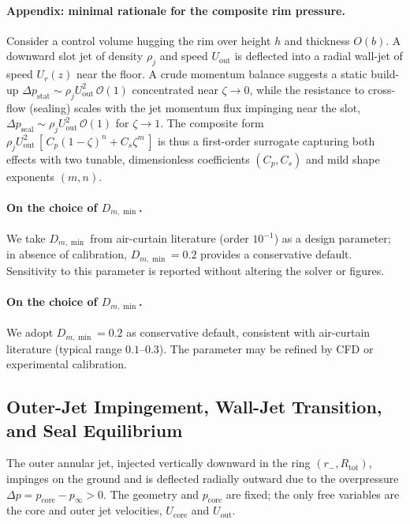 \documentclass[11pt,a4paper]{article}
\begin{document}
\paragraph{Appendix: minimal rationale for the composite rim pressure.}
Consider a control volume hugging the rim over height $h$ and thickness $O(b)$.
A downward slot jet of density $\rho_j$ and speed $U_{\mathrm{out}}$ is deflected
into a radial wall-jet of speed $U_r(z)$ near the floor. A crude momentum balance
suggests a static build-up $\Delta p_{\mathrm{stat}}\sim \rho_j U_{\mathrm{out}}^2
\,\mathcal{O}(1)$ concentrated near $\zeta\!\to\!0$, while the resistance to
cross-flow (sealing) scales with the jet momentum flux impinging near the slot,
$\Delta p_{\mathrm{seal}}\sim \rho_j U_{\mathrm{out}}^2\,\mathcal{O}(1)$ for
$\zeta\!\to\!1$. The composite form
$\rho_j U_{\mathrm{out}}^2\,[\,C_p(1-\zeta)^n + C_s \zeta^m\,]$ is thus a
first-order surrogate capturing both effects with two tunable, dimensionless
coefficients $(C_p,C_s)$ and mild shape exponents $(m,n)$.

\paragraph{On the choice of $D_{m,\min}$.}
We take $D_{m,\min}$ from air-curtain literature (order $10^{-1}$) as a design parameter; in absence of calibration, $D_{m,\min}=0.2$ provides a conservative default.
Sensitivity to this parameter is reported without altering the solver or figures.

\paragraph{On the choice of $D_{m,\min}$.}
We adopt $D_{m,\min}=0.2$ as conservative default, consistent with air-curtain literature (typical range $0.1$--$0.3$). The parameter may be refined by CFD or experimental calibration.


\subsection*{Outer-Jet Impingement, Wall-Jet Transition, and Seal Equilibrium}

The outer annular jet, injected vertically downward in the ring $(r_- , R_{\mathrm{tot}})$,
impinges on the ground and is deflected radially outward due to the overpressure
$\Delta p = p_{\mathrm{core}} - p_\infty > 0$.
The geometry and $p_{\mathrm{core}}$ are fixed; the only free variables are the core and outer jet velocities,
$U_{\mathrm{core}}$ and $U_{\mathrm{out}}$.
\end{document}
